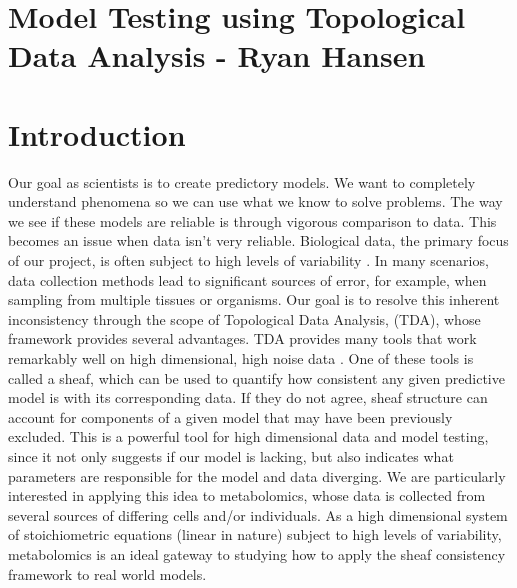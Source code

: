 \documentclass[10.5pt]{article}
\begin{document}
\section*{Model Testing using Topological Data Analysis - Ryan Hansen}

\section{Introduction}

Our goal as scientists is to create predictory models. We want to completely understand phenomena so we can use what we know to solve problems. The way we see if these models are reliable is through vigorous comparison to data. This becomes an issue when data isn't very reliable. Biological data, the primary focus of our project, is often subject to high levels of variability \cite{bionoise}. In many scenarios, data collection methods lead to significant sources of error, for example, when sampling from multiple tissues or organisms. Our goal is to resolve this inherent inconsistency through the scope of Topological Data Analysis, (TDA), whose framework provides several advantages. TDA provides many tools that work remarkably well on high dimensional, high noise data \cite{robinson2017sheaves}. One of these tools is called a sheaf, which can be used to quantify how consistent any given predictive model is with its corresponding data. If they do not agree, sheaf structure can account for components of a given model that may have been previously excluded. This is a powerful tool for high dimensional data and model testing, since it not only suggests if our model is lacking, but also indicates what parameters are responsible for the model and data diverging. We are particularly interested in applying this idea to metabolomics, whose data is collected from several sources of differing cells and/or individuals. As a high dimensional system of stoichiometric equations (linear in nature) subject to high levels of variability, metabolomics is an ideal gateway to studying how to apply the sheaf consistency framework to real world models.
\end{document}

